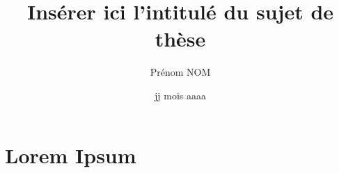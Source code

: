 \documentclass[a4paper, 11pt]{book}
\title{Insérer ici l'intitulé du sujet de thèse}
\author{Prénom NOM}
\institute{MINES ParisTech}
\date{jj mois aaaa}
\begin{document}
\maketitle{}

\section{Lorem Ipsum}

\lipsum{}
\end{document}
